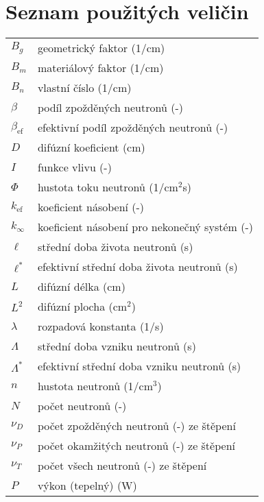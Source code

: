 \section*{Seznam použitých veličin}

\renewcommand{\arraystretch}{1.2}
\begin{table}[H]
\begin{tabular}{p{1cm}l}
  $B_g$           & geometrický faktor (1/cm) \\
  $B_m$           & materiálový faktor (1/cm) \\
  $B_n$           & vlastní číslo (1/cm) \\
  $\beta$         & podíl zpožděných neutronů (-) \\
  $\beta_{\text{ef}}$  & efektivní podíl zpožděných neutronů (-) \\
  $D$             & difúzní koeficient (cm) \\
  $I$             & funkce vlivu (-) \\
  $\Phi$          & hustota toku neutronů (1/cm$^2$s) \\
  $k_{\text{ef}}$ & koeficient násobení (-) \\
  $k_{\infty}$    & koeficient násobení pro nekonečný systém (-) \\
  $\ell$          & střední doba života neutronů (s) \\
  $\ell^*$        & efektivní střední doba života neutronů (s) \\
  $L$             & difúzní délka (cm) \\
  $L^2$           & difúzní plocha (cm$^2$) \\
  $\lambda$       & rozpadová konstanta (1/s) \\
  $\Lambda$       & střední doba vzniku neutronů (s) \\
  $\Lambda^*$     & efektivní střední doba vzniku neutronů (s) \\
  $n$             & hustota neutronů (1/cm$^3$) \\
  $N$             & počet neutronů (-) \\
  $\nu_D$         & počet zpožděných neutronů (-) ze štěpení \\
  $\nu_P$         & počet okamžitých neutronů (-) ze štěpení \\
  $\nu_T$         & počet všech neutronů (-) ze štěpení \\
  $P$             & výkon (tepelný) (W) \\

\end{tabular}
\end{table}
